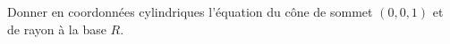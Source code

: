 
\begin{exercice}\label{exoOutilsMath-0024}

	Donner en coordonnées cylindriques l'équation du cône de sommet $(0,0,1)$ et de rayon à la base $R$.

\end{exercice}
